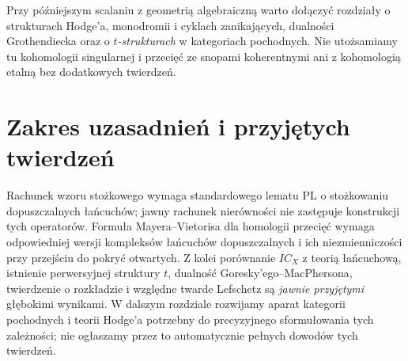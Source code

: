 Przy późniejszym scalaniu z geometrią algebraiczną
warto dołączyć rozdziały o strukturach Hodge'a,
monodromii i cyklach zanikających, dualności
Grothendiecka oraz o \emph{$t$-strukturach} w kategoriach
pochodnych. Nie utożsamiamy tu kohomologii
singularnej i przecięć ze snopami koherentnymi
ani z kohomologią etalną bez dodatkowych twierdzeń.



\section{Zakres uzasadnień i przyjętych twierdzeń}
\label{sec:xiii-status-po-audycie}
\begin{uwaga}
Rachunek wzoru stożkowego wymaga standardowego lematu
PL o stożkowaniu dopuszczalnych łańcuchów; jawny
rachunek nierówności nie zastępuje konstrukcji
tych operatorów. Formuła Mayera--Vietorisa dla
homologii przecięć wymaga odpowiedniej wersji
kompleksów łańcuchów dopuszczalnych i ich
niezmienniczości przy przejściu do pokryć otwartych.
Z kolei porównanie $IC_X$ z teorią łańcuchową,
istnienie perwersyjnej struktury $t$, dualność
Goresky'ego--MacPhersona, twierdzenie o rozkładzie
i względne twarde Lefschetz są \emph{jawnie
przyjętymi} głębokimi wynikami. W dalszym
rozdziale rozwijamy aparat kategorii pochodnych
i teorii Hodge'a potrzebny do precyzyjnego
sformułowania tych zależności; nie ogłaszamy
przez to automatycznie pełnych dowodów tych twierdzeń.
\end{uwaga}
